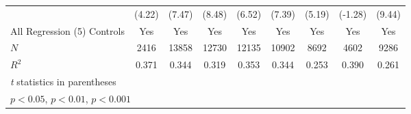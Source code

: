 \begin{table}[htbp]
\begin{tabular}{l*{8}{c}}
            &      (4.22)         &      (7.47)         &      (8.48)         &      (6.52)         &      (7.39)         &      (5.19)         &     (-1.28)         &      (9.44)         \\
[1em]
All Regression (5) Controls&         Yes         &         Yes         &         Yes         &         Yes         &         Yes         &         Yes         &         Yes         &         Yes         \\
\hline
\(N\)       &        2416         &       13858         &       12730         &       12135         &       10902         &        8692         &        4602         &        9286         \\
\(R^{2}\)   &       0.371         &       0.344         &       0.319         &       0.353         &       0.344         &       0.253         &       0.390         &       0.261         \\
\hline\hline
\multicolumn{9}{l}{\footnotesize \textit{t} statistics in parentheses}\\
\multicolumn{9}{l}{\footnotesize \sym{*} \(p<0.05\), \sym{**} \(p<0.01\), \sym{***} \(p<0.001\)}\\
\end{tabular}
\end{table}
